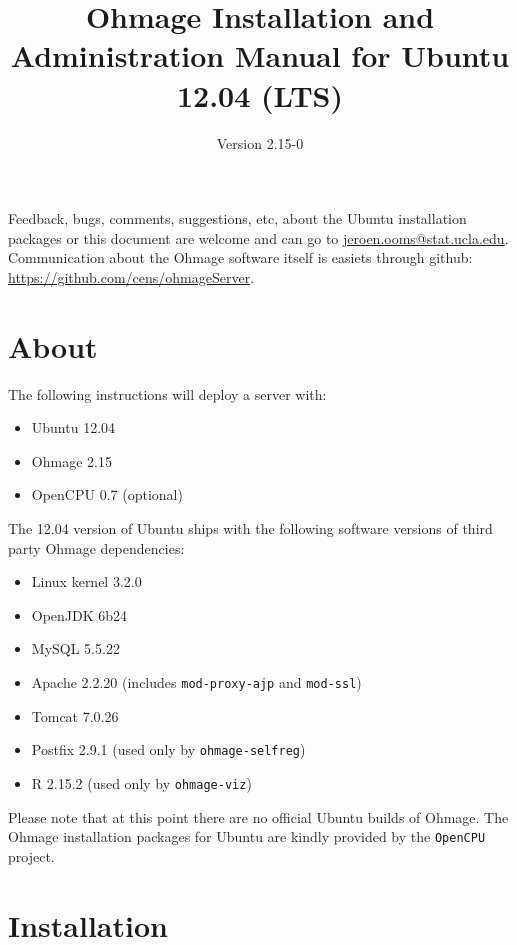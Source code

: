 \documentclass{scrartcl}
\title{Ohmage Installation and Administration Manual for Ubuntu 12.04 (LTS)}
\subtitle{Version 2.15-0}
\begin{document}
\maketitle

\noindent Feedback, bugs, comments, suggestions, etc, about the Ubuntu
installation packages or this document are welcome and can go to
\href{mailto:jeroen.ooms@stat.ucla.edu}{jeroen.ooms@stat.ucla.edu}.
Communication about the Ohmage software itself is easiets through github:
\href{https://github.com/cens/ohmageServer}{https://github.com/cens/ohmageServer}.


\section*{About}

The following instructions will deploy a server with:

\begin{itemize}
  \item Ubuntu 12.04
  \item Ohmage 2.15
  \item OpenCPU 0.7 (optional)
\end{itemize}

\noindent The 12.04 version of Ubuntu ships with the following
software versions of third party Ohmage dependencies:

\begin{itemize}
  \item Linux kernel 3.2.0
  \item OpenJDK 6b24
  \item MySQL 5.5.22
  \item Apache 2.2.20 (includes \texttt{mod-proxy-ajp} and \texttt{mod-ssl})
  \item Tomcat 7.0.26
  \item Postfix 2.9.1 (used only by \texttt{ohmage-selfreg})
  \item R 2.15.2 (used only by \texttt{ohmage-viz})
\end{itemize}

\noindent Please note that at this point there are no official Ubuntu builds of
Ohmage. The Ohmage installation packages for Ubuntu are kindly provided by the
\texttt{OpenCPU} project.



\section{Installation}
\end{document}

